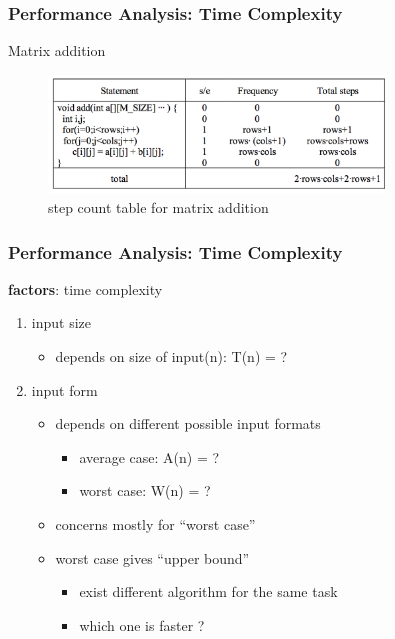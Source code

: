 \documentclass[newPxFont,sthlmFooter,nooffset]{beamer}
\begin{document}
\begin{frame}[t]
  \frametitle{Performance Analysis: Time Complexity}
Matrix addition
  \begin{figure}[h]
    \centering
    \includegraphics[width=0.8\textwidth]{figures/fig03_mat.png}
    \caption{step count table for matrix addition}
  \end{figure}
\end{frame}


\begin{frame}[t]
  \frametitle{Performance Analysis: Time Complexity}
\textbf{factors}: time complexity 
\begin{enumerate}
\item input size
  \begin{itemize}
  \item depends on size of input(n): T(n) = ?
  \end{itemize}

\item input form
  \begin{itemize}
  \item depends on different possible input formats
    \begin{itemize}
    \item average case: A(n) = ?
    \item worst case: W(n) = ?
    \end{itemize}

  \item concerns mostly for ``worst case''
  \item worst case gives ``upper bound''
    \begin{itemize}
    \item exist different algorithm for the same task
    \item which one is faster ?
    \end{itemize}

  \end{itemize}

\end{enumerate}

\end{frame}
\end{document}
